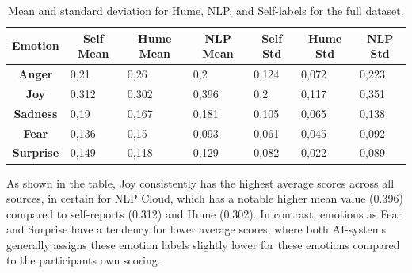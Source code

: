 \begin{table}[!h]
    \centering
    \begin{tabular}{c|llllll}
    \textbf{Emotion}  & \multicolumn{1}{c}{\textbf{Self Mean}} & \multicolumn{1}{c}{\textbf{Hume Mean}} & \multicolumn{1}{c}{\textbf{NLP Mean}} & \multicolumn{1}{c}{\textbf{Self Std}} & \multicolumn{1}{c}{\textbf{Hume Std}} & \multicolumn{1}{c}{\textbf{NLP Std}} \\ \hline
    \textbf{Anger}    & 0,21                                   & 0,26                                   & 0,2                                   & 0,124                                 & 0,072                                 & 0,223                                \\
    \textbf{Joy}      & 0,312                                  & 0,302                                  & 0,396                                 & 0,2                                   & 0,117                                 & 0,351                                \\
    \textbf{Sadness}  & 0,19                                   & 0,167                                  & 0,181                                 & 0,105                                 & 0,065                                 & 0,138                                \\
    \textbf{Fear}     & 0,136                                  & 0,15                                   & 0,093                                 & 0,061                                 & 0,045                                 & 0,092                                \\
    \textbf{Surprise} & 0,149                                  & 0,118                                  & 0,129                                 & 0,082                                 & 0,022                                 & 0,089                               
    \end{tabular}
    \caption{Mean and standard deviation for Hume, NLP, and Self-labels for the full dataset.}
    \label{tab:summery-rq3}
\end{table}

As shown in the table, Joy consistently has the highest average scores across all sources, in certain for NLP Cloud,
which has a notable higher mean value (0.396) compared to self-reports (0.312) and Hume (0.302). 
In contrast, emotions as Fear and Surprise have a tendency for lower average scores, where both AI-systems generally assigns these 
emotion labels slightly lower for these emotions compared to the participants own scoring. 

